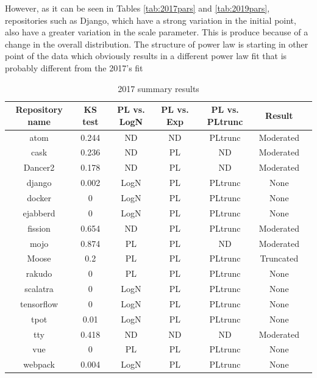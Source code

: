 \documentclass{article}
\begin{document}
However, as it can be seen in Tables \ref{tab:2017pars} and
\ref{tab:2019pars}, repositories such as Django, which have a strong
variation in the initial point, also have a greater variation in the
scale parameter. This is produce because of a change in the overall
distribution. The structure of power law is starting in other point of
the data which obviously results in a different power law fit that is
probably different from the 2017's fit %
%
\begin{table}[h!tbp]
  \caption{2017 summary results}
  \begin{center}
    \begin{tabular}{| c |c| c | c| c |c | c |}
      \hline
      Repository name & KS test & PL vs. LogN & PL vs. Exp & PL vs. PLtrunc & Result \\ 
      \hline
      atom & 0.244 &ND & ND &PLtrunc & Moderated \\ 
      cask & 0.236 &ND & PL & ND & Moderated \\
      Dancer2 &0.178 &ND &PL &ND & Moderated \\
      django &0.002 &LogN &PL &PLtrunc &None\\
      docker &0 &LogN &PL &PLtrunc &None\\
      ejabberd &0 &LogN &PL &PLtrunc &None\\
      fission &0.654 &ND &PL &PLtrunc & Moderated\\
      mojo &0.874 &PL &PL &ND & Moderated \\
      Moose &0.2 &PL &PL &PLtrunc & Truncated\\
      rakudo &0 &PL &PL &PLtrunc & None\\
      scalatra &0 &LogN &PL &PLtrunc & None\\
      tensorflow &0 &LogN &PL &PLtrunc & None\\
      tpot &0.01 &LogN &PL &PLtrunc &None\\
      tty &0.418 &ND &ND &ND & Moderated \\
      vue &0 &PL &PL &PLtrunc & None\\
      webpack &0.004 &LogN &PL & PLtrunc & None\\
      \hline
    \end{tabular}
  \end{center}
  \label{tab:2017tests}
\end{table}
%
\end{document}
